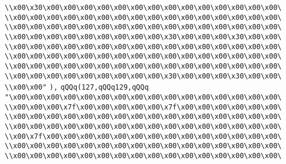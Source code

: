 \verb|\\x00\x30\x00\x00\x00\x00\x00\x00\x00\x00\x00\x00\x00\x00\x00\x00\|\newline
\verb|\\x00\x00\x00\x00\x00\x00\x00\x00\x00\x00\x00\x00\x00\x00\x00\x00\|\newline
\verb|\\x00\x00\x00\x00\x00\x00\x00\x00\x00\x00\x00\x00\x00\x00\x00\x00\|\newline
\verb|\\x00\x00\x00\x00\x00\x00\x00\x00\x00\x30\x00\x00\x00\x30\x00\x00\|\newline
\verb|\\x00\x00\x00\x00\x00\x00\x00\x00\x00\x00\x00\x00\x00\x00\x00\x00\|\newline
\verb|\\x00\x00\x00\x00\x00\x00\x00\x00\x00\x00\x00\x00\x00\x00\x00\x00\|\newline
\verb|\\x00\x00\x00\x00\x00\x00\x00\x00\x00\x00\x00\x00\x00\x00\x00\x00\|\newline
\verb|\\x00\x00\x00\x00\x00\x00\x00\x00\x00\x30\x00\x00\x00\x30\x00\x00\|\newline
\verb|\\x00\x00"|\newline
\verb|),|\newline
\verb|qQQq(127,qQQq129,qQQq|\newline
\verb|"\x00\x00\x00\x00\x00\x00\x00\x00\x00\x00\x00\x00\x00\x00\x00\x00\|\newline
\verb|\\x00\x00\x00\x7f\x00\x00\x00\x00\x00\x7f\x00\x00\x00\x00\x00\x00\|\newline
\verb|\\x00\x00\x00\x00\x00\x00\x00\x00\x00\x00\x00\x00\x00\x00\x00\x00\|\newline
\verb|\\x00\x00\x00\x00\x00\x00\x00\x00\x00\x00\x00\x00\x00\x00\x00\x00\|\newline
\verb|\\x00\x7f\x00\x00\x00\x00\x00\x00\x00\x00\x00\x00\x00\x00\x00\x00\|\newline
\verb|\\x00\x00\x00\x00\x00\x00\x00\x00\x00\x00\x00\x00\x00\x00\x00\x00\|\newline
\verb|\\x00\x00\x00\x00\x00\x00\x00\x00\x00\x00\x00\x00\x00\x00\x00\x00\|\newline
